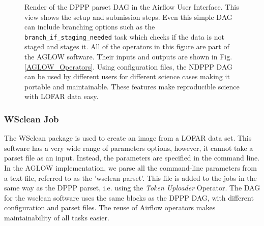\begin{figure}[H]
 \centering
    \caption[Renderng of the DAG encoding a DPPP parset as shown by the Airflow User Interface.]{Render of the DPPP parset DAG in the Airflow User Interface. This view shows the setup and submission steps. Even this simple DAG can include branching options such as the \texttt{branch\_if\_staging\_needed} task which checks if the data is not staged and stages it. All of the operators in this figure are part of the AGLOW software. Their inputs and outputs are shown in Fig. \ref{AGLOW_Operators}. Using configuration files, the NDPPP DAG can be used by different users for different science cases making it portable and maintainable. These features make reproducible science with LOFAR data easy. 
 }
 \label{fig:NDPPP_DAG}
\end{figure}

\subsubsection{WSclean Job}

The WSclean\cite{wsclean} package is used to create an image from a LOFAR data set. This software has a very wide range of parameters options, however, it cannot take a parset file as an input. Instead, the parameters are specified in the command line. In the AGLOW implementation, we parse all the command-line parameters from a text file, referred to as the 'wsclean parset'. This file is added to the jobs in the same way as the DPPP parset, i.e. using the \textit{Token Uploader} Operator. The DAG for the wsclean software uses the same blocks as the DPPP DAG, with different configuration and parset files. The reuse of Airflow operators makes maintainability of all tasks easier. 

